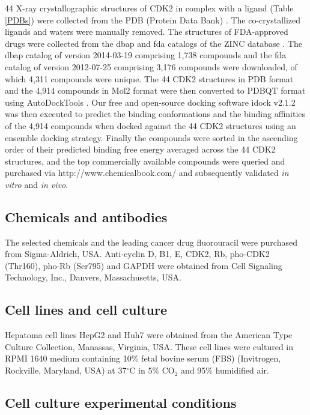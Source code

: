 \documentclass[10pt]{article}
\begin{document}
44 X-ray crystallographic structures of CDK2 in complex with a ligand (Table \ref{PDBs}) were collected from the PDB (Protein Data Bank) \cite{540,537}. The co-crystallized ligands and waters were manually removed. The structures of FDA-approved drugs were collected from the dbap and fda catalogs of the ZINC database \cite{532,1178}. The dbap catalog of version 2014-03-19 comprising 1,738 compounds and the fda catalog of version 2012-07-25 comprising 3,176 compounds were downloaded, of which 4,311 compounds were unique. The 44 CDK2 structures in PDB format and the 4,914 compounds in Mol2 format were then converted to PDBQT format using AutoDockTools \cite{596}. Our free and open-source docking software idock v2.1.2 \cite{1153,1362} was then executed to predict the binding conformations and the binding affinities of the 4,914 compounds when docked against the 44 CDK2 structures using an ensemble docking strategy. Finally the compounds were sorted in the ascending order of their predicted binding free energy averaged across the 44 CDK2 structures, and the top commercially available compounds were queried and purchased via http://www.chemicalbook.com/ and subsequently validated \textit{in vitro} and \textit{in vivo}.

\subsection*{Chemicals and antibodies}

The selected chemicals and the leading cancer drug fluorouracil were purchased from Sigma-Aldrich, USA. Anti-cyclin D, B1, E, CDK2, Rb, pho-CDK2 (Thr160), pho-Rb (Ser795) and GAPDH were obtained from Cell Signaling Technology, Inc., Danvers, Massachusetts, USA.

\subsection*{Cell lines and cell culture}

Hepatoma cell lines HepG2 and Huh7 were obtained from the American Type Culture Collection, Manassas, Virginia, USA. These cell lines were cultured in RPMI 1640 medium containing 10\% fetal bovine serum (FBS) (Invitrogen, Rockville, Maryland, USA) at 37$^\circ$C in 5\% CO$_2$ and 95\% humidified air.

\subsection*{Cell culture experimental conditions}
\end{document}
